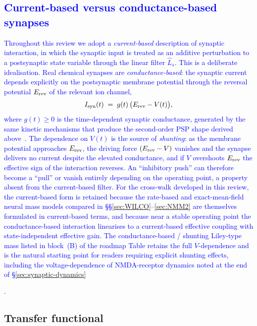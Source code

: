 \documentclass[12pt]{article}
\numberwithin{equation}{section}
\newcommand{\rev}[1]{\textcolor{blue}{#1}}
\begin{document}
\rev{\subsection{Current-based versus conductance-based synapses}
\label{sec:current-vs-conductance}
Throughout this review we adopt a \emph{current-based} description of synaptic interaction, in which the synaptic input is treated as an additive perturbation to a postsynaptic state variable through the linear filter $\hat{L}_s$. This is a deliberate idealisation. Real chemical synapses are \emph{conductance-based}: the synaptic current depends explicitly on the postsynaptic membrane potential through the reversal potential $E_{\rm rev}$ of the relevant ion channel,
\begin{equation}
I_{\rm syn}(t) \;=\; g(t)\,\bigl(E_{\rm rev} - V(t)\bigr),
\label{eq:conductance-syn}
\end{equation} 
where $g(t)\ge 0$ is the time-dependent synaptic conductance, generated by the same kinetic mechanisms that produce the second-order PSP shape derived above~\cite{destexhe1994,Dest}. The dependence on $V(t)$ is the source of \emph{shunting}: as the membrane potential approaches $E_{\rm rev}$, the driving force $(E_{\rm rev}-V)$ vanishes and the synapse delivers no current despite the elevated conductance, and if $V$ overshoots $E_{\rm rev}$ the effective sign of the interaction reverses. An ``inhibitory push'' can therefore become a ``pull'' or vanish entirely depending on the operating point, a property absent from the current-based filter. For the cross-walk developed in this review, the current-based form is retained because the rate-based and exact-mean-field neural mass models compared in \S\S\ref{sec:WILCO}--\ref{sec:NMM2} are themselves formulated in current-based terms, and because near a stable operating point the conductance-based interaction linearises to a current-based effective coupling with state-independent effective gain. The conductance-based / shunting Liley-type mass listed in block~(B) of the roadmap Table retains the full $V$-dependence and is the natural starting point for readers requiring explicit shunting effects, including the voltage-dependence of NMDA-receptor dynamics noted at the end of \S\ref{sec:synaptic-dynamics}}.

\subsection{Transfer functional}

\end{document}
